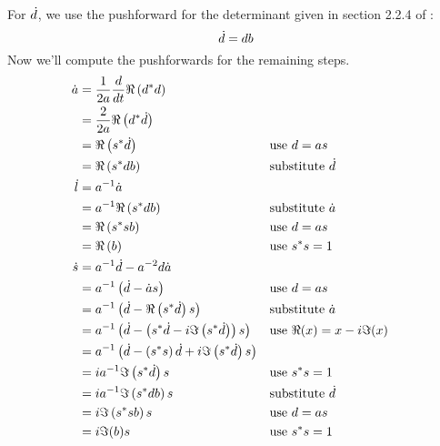 \documentclass[../main.tex]{subfiles}
\begin{document}
\begin{refsection}
For $\dot{d}$, we use the pushforward for the determinant given in section 2.2.4 of \cite{giles_extended_2008}:
\[\dot{d} = d b\]
Now we'll compute the pushforwards for the remaining steps.
\begingroup
\allowdisplaybreaks
\begin{align*}
\dot{a} &= \frac{1}{2 a} \frac{d}{dt}
                         \Re\left( {d}^* d \right)\\
        &= \frac{2}{2 a} \Re \left( {d}^* \dot{d} \right)\\
        &= \Re \left( {s}^* \dot{d} \right)
            && \text{use } d = a s \\
        &= \Re \left( {s}^* d b \right)
            && \text{substitute } \dot{d} \\
\dot{l} &= a^{-1} \dot{a}\\
        &= a^{-1} \Re \left( {s}^* d b \right)
            && \text{substitute } \dot{a}\\
        &= \Re \left( {s}^* s b \right)
            && \text{use } d = a s \\
        &= \Re \left(b \right)
            && \text{use } {s}^* s = 1\\
\dot{s} &= a^{-1} \dot{d} - a^{-2} d \dot{a}\\
        &= a^{-1} \left( \dot{d} - \dot{a} s \right)
            && \text{use } d = a s \\
        &= a^{-1} \left(
               \dot{d} - \Re \left( {s}^* \dot{d} \right) s
           \right)
            && \text{substitute } \dot{a}\\
        &= a^{-1} \left(
               \dot{d} - \left(
                   {s}^* \dot{d} -
                   i \Im \left( {s}^* \dot{d} \right)
               \right) s
           \right)
            && \text{use } \Re(x) = x - i \Im(x)\\
        &= a^{-1} \left(
               \dot{d} - \left( {s}^* s \right) \dot{d} +
               i \Im \left( {s}^* \dot{d} \right) s 
               \right)\\
        &= i a^{-1} \Im \left( {s}^* \dot{d} \right) s
            && \text{use } {s}^* s = 1\\
        &= i a^{-1} \Im \left( {s}^* d b \right) s
            && \text{substitute } \dot{d}\\
        &= i \Im \left( {s}^* s b \right) s
            && \text{use } d = a s \\
        &= i \Im(b) s
            && \text{use } {s}^* s = 1
\end{align*}
\endgroup


\end{refsection}
\end{document}
